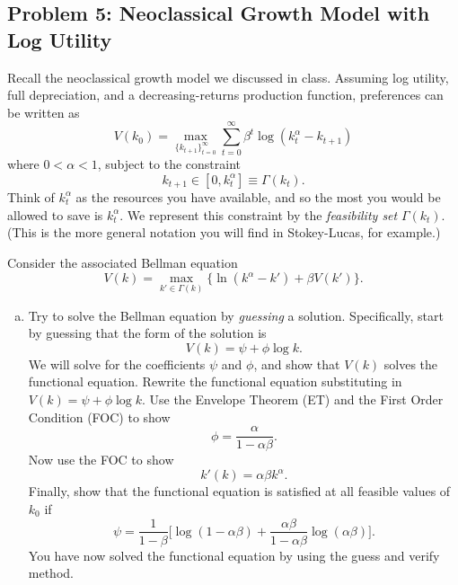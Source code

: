 \documentclass[11pt]{extarticle}
\theoremstyle{plain}
\theoremstyle{definition}
\begin{document}
\begin{enumerate}[(a)]
\section*{Problem 5: Neoclassical Growth Model with Log Utility}

Recall the neoclassical growth model we discussed in class. Assuming log utility, full depreciation, and a decreasing-returns production function, preferences can be written as
\begin{equation*}
	V(k_0) = \max_{ \{ k_{t+1} \}_{t=0}^\infty} \sum_{t=0}^\infty \beta^t \log (k_t^\alpha - k_{t+1})
\end{equation*}
where $0 < \alpha < 1$, subject to the constraint
\begin{equation*}
	k_{t+1} \in [0, k_t^\alpha] \equiv \Gamma(k_t).
\end{equation*}
Think of $k_t^\alpha$ as the resources you have available, and so the most you would be allowed to save is $k_t^\alpha$. We represent this constraint by the \textit{feasibility set} $\Gamma(k_t)$. (This is the more general notation you will find in Stokey-Lucas, for example.)

Consider the associated Bellman equation 
\begin{equation*}
	V(k) = \max_{k' \in \Gamma(k)} \bigg\{ \ln (k^\alpha - k') + \beta V(k') \bigg\}.
\end{equation*}

\begin{enumerate}[(a)]
\item Try to solve the Bellman equation by \textit{guessing} a solution. Specifically, start by guessing that the form of the solution is 
\begin{equation*}
	V(k) = \psi + \phi \log k.
\end{equation*}
We will solve for the coefficients $\psi$ and $\phi$, and show that $V(k)$ solves the functional equation. Rewrite the functional equation substituting in $V(k) = \psi + \phi \log k$. Use the Envelope Theorem (ET) and the First Order Condition (FOC) to show 
\begin{equation*}
	\phi = \frac{\alpha}{1 - \alpha \beta}.
\end{equation*}
Now use the FOC to show 
\begin{equation*}
	k'(k) = \alpha \beta k^\alpha.
\end{equation*}
Finally, show that the functional equation is satisfied at all feasible values of $k_0$ if 
\begin{equation*}
	\psi =\frac{1}{1-\beta }\bigg[ \log (1-\alpha \beta)+\frac{\alpha \beta}{1-\alpha \beta}\log (\alpha \beta )\bigg] .
\end{equation*}
You have now solved the functional equation by using the guess and verify method.


\end{enumerate}
\end{enumerate}
\end{document}

